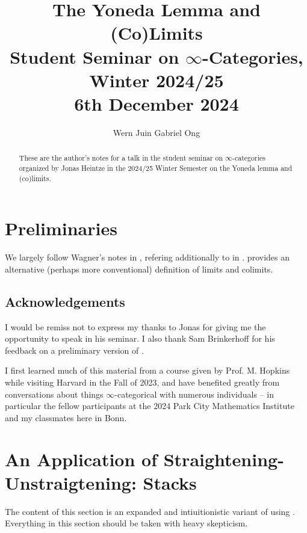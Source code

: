 \documentclass{amsart}
\theoremstyle{definition}
\numberwithin{equation}{section}
\begin{document}
\large
\title[The Yoneda Lemma and (Co)Limits]{The Yoneda Lemma and (Co)Limits \\ Student Seminar on $\infty$-Categories, Winter 2024/25 \\ 6th December 2024}
\author{Wern Juin Gabriel Ong}
\address{Universit\"{a}t Bonn, Bonn, D-53113}
\maketitle
\begin{abstract}
  These are the author's notes for a talk in the student seminar on $\infty$-categories organized by Jonas Heintze in the 2024/25 Winter Semester on the Yoneda lemma and (co)limits.
\end{abstract}
\section*{Preliminaries}
We largely follow Wagner's notes \cite{Wagner} in , refering additionally to \cite{Youcis} in .  provides an alternative (perhaps more conventional) definition of limits and colimits.

\subsection*{Acknowledgements} I would be remiss not to express my thanks to Jonas for giving me the opportunity to speak in his seminar. I also thank Sam Brinkerhoff for his feedback on a preliminary version of .

I first learned much of this material from a course given by Prof. M. Hopkins while visiting Harvard in the Fall of 2023, and have benefited greatly from conversations about things $\infty$-categorical with numerous individuals -- in particular the fellow participants at the 2024 Park City Mathematics Institute and my classmates here in Bonn.
\section{An Application of Straightening-Unstraigtening: Stacks}\label{sec: descent}
The content of this section is an expanded and intiuitionistic variant of \cite[\S 5.7]{Wagner} using \cite{Youcis}. Everything in this section should be taken with heavy skepticism.
\end{document}
